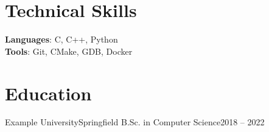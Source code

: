 \documentclass[letterpaper,11pt]{article}
\begin{document}
    \resumeSubHeadingListEnd


\section{Technical Skills}
    \begin{itemize}[leftmargin=0.15in, label={}]
        \small{
            \item{
                \textbf{Languages}{: C, C++, Python} \\
                \textbf{Tools}{: Git, CMake, GDB, Docker} \\
            }
        }
    \end{itemize}


\section{Education}
    \resumeSubHeadingListStart
        \resumeSubheading
            {Example University}{Springfield}
            {B.Sc. in Computer Science}{2018 -- 2022}
    \resumeSubHeadingListEnd
\end{document}
